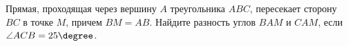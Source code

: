 \begin{ex}
	\begin{condition}
		Прямая, проходящая через вершину \( A \) треугольника \( ABC \), пересекает сторону \( BC  \) в точке \( M  \), причем \( BM = AB \). Найдите разность углов \( BAM  \) и \( CAM  \), если \( \angle ACB = 25\degree\).
	\end{condition}
	\answer{\( 25\degree \)}
\end{ex}